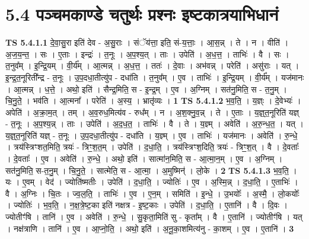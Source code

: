 \documentclass[17pt]{extarticle}
\begin{document}
\section*{ 5.4      पञ्चमकाण्डे चतुर्थः प्रश्नः इष्टकात्रयाभिधानं }
                                \textbf{ TS 5.4.1.1} \newline
                  दे॒वा॒सु॒रा इति॑ देव - अ॒सु॒राः । संॅय॑त्ता॒ इति॒ सं-य॒त्ताः॒ । आ॒स॒न्न् । ते । न । वीति॑ । अ॒ज॒य॒न्त॒ । सः । ए॒ताः । इन्द्रः॑ । त॒नूः । अ॒प॒श्य॒त् । ताः । उपेति॑ । अ॒ध॒त्त॒ । ताभिः॑ । वै । सः । त॒नुव᳚म् । इ॒न्द्रि॒यम् । वी॒र्य᳚म् । आ॒त्मन्न् । अ॒ध॒त्त॒ । ततः॑ । दे॒वाः । अभ॑वन्न् । परेति॑ । असु॑राः । यत् । इ॒न्द्र॒त॒नूरिती᳚न्द्र - त॒नूः । उ॒प॒दधा॒तीत्यु॑प - दधा॑ति । त॒नुव᳚म् । ए॒व । ताभिः॑ । इ॒न्द्रि॒यम् । वी॒र्य᳚म् । यज॑मानः । आ॒त्मन्न् । ध॒त्ते॒ । अथो॒ इति॑ । सैन्द्र॒मिति॒ स - इ॒न्द्र॒म् । ए॒व । अ॒ग्निम् । सत॑नु॒मिति॒ स - त॒नु॒म् । चि॒नु॒ते॒ । भव॑ति । आ॒त्मना᳚ । परेति॑ । अ॒स्य॒ । भ्रातृ॑व्यः । \textbf{  1} \newline
                  \newline
                                \textbf{ TS 5.4.1.2} \newline
                  भ॒व॒ति॒ । य॒ज्ञ्ः । दे॒वेभ्यः॑ । अपेति॑ । अ॒क्रा॒म॒त् । तम् । अ॒व॒रुध॒मित्य॑व - रुध᳚म् । न । अ॒श॒क्नु॒व॒न्न् । ते । ए॒ताः । य॒ज्ञ्॒त॒नूरिति॑ यज्ञ् - त॒नूः । अ॒प॒श्य॒न्न् । ताः । उपेति॑ । अ॒द॒ध॒त॒ । ताभिः॑ । वै । ते । य॒ज्ञ्म् । अवेति॑ । अ॒रु॒न्ध॒त॒ । यत् । य॒ज्ञ्॒त॒नूरिति॑ यज्ञ् - त॒नूः । उ॒प॒दधा॒तीत्यु॑प - दधा॑ति । य॒ज्ञ्म् । ए॒व । ताभिः॑ । यज॑मानः । अवेति॑ । रु॒न्धे॒ । त्रय॑स्त्रिꣳशत॒मिति॒ त्रयः॑ - त्रिꣳ॒॒श॒त॒म् । उपेति॑ । द॒धा॒ति॒ । त्रय॑स्त्रिꣳश॒दिति॒ त्रयः॑ - त्रिꣳ॒॒श॒त् । वै । दे॒वताः᳚ । दे॒वताः᳚ । ए॒व । अवेति॑ । रु॒न्धे॒ । अथो॒ इति॑ । सात्मा॑न॒मिति॒ स - आ॒त्मा॒न॒म् । ए॒व । अ॒ग्निम् । सत॑नु॒मिति॒ स-त॒नु॒म् । चि॒नु॒ते॒ । सात्मेति॒ स - आ॒त्मा॒ । अ॒मुष्मिन्॑ । लो॒के । \textbf{  2} \newline
                  \newline
                                \textbf{ TS 5.4.1.3} \newline
                  भ॒व॒ति॒ । यः । ए॒वम् । वेद॑ । ज्योति॑ष्मतीः । उपेति॑ । द॒धा॒ति॒ । ज्योतिः॑ । ए॒व । अ॒स्मि॒न्न् । द॒धा॒ति॒ । ए॒ताभिः॑ । वै । अ॒ग्निः । चि॒तः । ज्व॒ल॒ति॒ । ताभिः॑ । ए॒व । ए॒न॒म् । समिति॑ । इ॒न्धे॒ । उ॒भयोः᳚ । अ॒स्मै॒ । लो॒कयोः᳚ । ज्योतिः॑ । भ॒व॒ति॒ । न॒क्ष॒त्रे॒ष्ट॒का इति॑ नक्षत्र - इ॒ष्ट॒काः । उपेति॑ । द॒धा॒ति॒ । ए॒तानि॑ । वै । दि॒वः । ज्योतीꣳ॑षि । तानि॑ । ए॒व । अवेति॑ । रु॒न्धे॒ । सु॒कृता॒मिति॑ सु - कृता᳚म् । वै । ए॒तानि॑ । ज्योतीꣳ॑षि । यत् । नक्ष॑त्राणि । तानि॑ । ए॒व । आ॒प्नो॒ति॒ । अथो॒ इति॑ । अ॒नू॒का॒शमित्य॑नु - का॒शम् । ए॒व । ए॒तानि॑ । \textbf{  3} \newline
\end{document}
